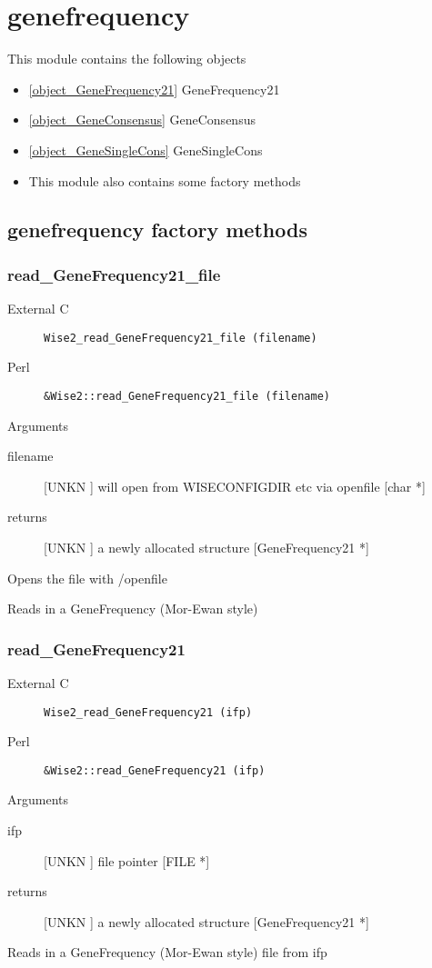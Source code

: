 \section{genefrequency}
\label{module_genefrequency}
This module contains the following objects

\begin{itemize}
\item \ref{object_GeneFrequency21} GeneFrequency21

\item \ref{object_GeneConsensus} GeneConsensus

\item \ref{object_GeneSingleCons} GeneSingleCons

\item This module also contains some factory methods
\end{itemize}
\subsection{genefrequency factory methods}
\subsubsection{read_GeneFrequency21_file}
\begin{description}
\item[External C] {\tt Wise2_read_GeneFrequency21_file (filename)}
\item[Perl] {\tt &Wise2::read_GeneFrequency21_file (filename)}

\end{description}
Arguments
\begin{description}
\item[filename] [UNKN ] will open from WISECONFIGDIR etc via openfile [char *]
\item[returns] [UNKN ] a newly allocated structure [GeneFrequency21 *]
\end{description}
Opens the file with /openfile


Reads in a GeneFrequency (Mor-Ewan style)




\subsubsection{read_GeneFrequency21}
\begin{description}
\item[External C] {\tt Wise2_read_GeneFrequency21 (ifp)}
\item[Perl] {\tt &Wise2::read_GeneFrequency21 (ifp)}

\end{description}
Arguments
\begin{description}
\item[ifp] [UNKN ] file pointer [FILE *]
\item[returns] [UNKN ] a newly allocated structure [GeneFrequency21 *]
\end{description}
Reads in a GeneFrequency (Mor-Ewan style)
file from ifp




